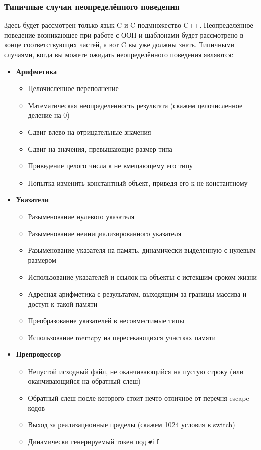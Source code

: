 \documentclass[a4paper,12pt,oneside]{article}
\begin{document}
\subsubsection{Типичные случаи неопределённого поведения}\label{TypicalUB}

Здесь будет рассмотрен только язык C и C-подмножество C++. Неопределённое поведение возникающее при работе с ООП и шаблонами будет рассмотрено в конце соответствующих частей, а вот C вы уже должны знать. Типичными случаями, когда вы можете ожидать неопределённого поведения являются:

\begin {itemize}
\item \textbf {Арифметика}
\begin {itemize}
\item Целочисленное переполнение
\item Математическая неопределенность результата (скажем целочисленное деление на 0)
\item Сдвиг влево на отрицательные значения
\item Сдвиг на значения, превышающие размер типа
\item Приведение целого числа к не вмещающему его типу
\item Попытка изменить константный объект, приведя его к не константному
\end {itemize}
\item \textbf {Указатели}
\begin {itemize}
\item Разыменование нулевого указателя
\item Разыменование неинициализированного указателя
\item Разыменование указателя на память, динамически выделенную с нулевым размером
\item Использование указателей и ссылок на объекты с истекшим сроком жизни
\item Адресная арифметика с результатом, выходящим за границы массива и доступ к такой памяти
\item Преобразование указателей в несовместимые типы
\item Использование memcpy на пересекающихся участках памяти
\end {itemize}
\item \textbf {Препроцессор}
\begin {itemize}
\item Непустой исходный файл, не оканчивающийся на пустую строку (или оканчивающийся на обратный слеш)
\item Обратный слеш после которого стоит нечто отличное от перечня escape-кодов
\item Выход за реализационные пределы (скажем 1024 условия в switch)
\item Динамически генерируемый токен под \lstinline!#if!
\end {itemize}
\end {itemize}
\end{document}
